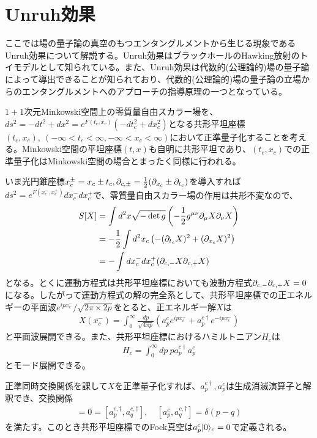 \section{Unruh効果}\label{sec:unruh}
ここでは場の量子論の真空のもつエンタングルメントから生じる現象であるUnruh効果について解説する。Unruh効果はブラックホールのHawking放射のトイモデルとして知られている。また、Unruh効果は代数的(公理論的)場の量子論によって導出できることが知られており、代数的(公理論的)場の量子論の立場からのエンタングルメントへのアプローチの指導原理の一つとなっている。

$1+1$次元Minkowski空間上の零質量自由スカラー場を、$ds^2=-dt^2+dx^2=e^{F(t_c,x_c)}(-dt_c^2+dx_c^2)$となる共形平坦座標$(t_c,x_c),\ (-\infty<t_c<\infty,-\infty<x_c<\infty)$において正準量子化することを考える。Minkowski空間の平坦座標$(t,x)$も自明に共形平坦であり、$(t_c,x_c)$での正準量子化はMinkowski空間の場合とまったく同様に行われる。

いま光円錐座標$x_c^\pm=x_c\pm t_c,\partial_{c,\pm}=\frac{1}{2}(\partial_{x_c}\pm \partial_{t_c})$を導入すれば$ds^2=e^{F(x_c^-,x_c^+)}dx_c^-dx_c^+$で、零質量自由スカラー場の作用は共形不変なので、
\begin{align}
S[X]&=\int d^2 x\sqrt{-\det g} \left(-\frac{1}{2}g^{\mu\nu}\partial_\mu X \partial_\nu X\right)\notag\\
&=-\frac{1}{2}\int d^2x_c \left( -(\partial_{t_c}X)^2+(\partial_{x_c}X)^2 \right)\\
&=-\int dx_c^-dx_c^+(\partial_{c,-} X \partial_{c,+} X)
\end{align}
となる。とくに運動方程式は共形平坦座標においても波動方程式$\partial_{c,-}\partial_{c,+} X=0$になる。したがって運動方程式の解の完全系として、共形平坦座標での正エネルギーの平面波$e^{ip x_c^-}/\sqrt{2\pi\times 2p}$をとると、正エネルギー解$X$は
\begin{align}
X(x_c^-)=\int_{0}^{\infty} \frac{dp}{\sqrt{4\pi p}} (a_p^{c}e^{ip x_c^-}+a_p^{c\dagger}e^{-ip x_c^-})
\end{align}
と平面波展開できる。また、共形平坦座標におけるハミルトニアン$H_c$は
\begin{align}
H_c=\int_0^\infty dp\  p a_p^{c\dagger} a_p^c
\end{align}
とモード展開できる。

正準同時交換関係を課して$X$を正準量子化すれば、$a_p^{c\dagger},a_p^c$は生成消滅演算子と解釈でき、交換関係
\begin{align}
[a_p^c,a_q^c]=0=[a_p^{c,\dagger},a_q^{c,\dagger}],\quad [a_p^c,a_q^{c,\dagger}]=\delta(p-q)
\end{align}
を満たす。このとき共形平坦座標でのFock真空は$a_p^c|0\rangle_c=0$で定義される。

